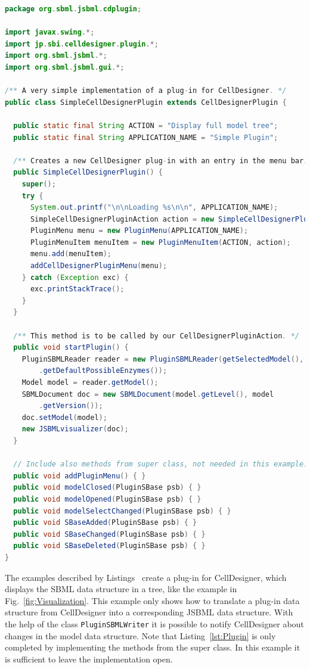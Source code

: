 \documentclass[
  BCOR12mm,
  letterpaper,
  11pt,
  headsepline,
  pointlessnumbers,
  tablecaptionabove,
  onelinecaption,
  headinclude,
  appendixprefix,
  idxtotoc,
  bibtotoc,
  twoside,
  titlepage
]{scrartcl}
\begin{document}
\begin{lstlisting}[language=Java,float,caption={A simple example for a
CellDesigner plug-in using JSBML as a communication layer},label=lst:Plugin]
package org.sbml.jsbml.cdplugin;

import javax.swing.*;
import jp.sbi.celldesigner.plugin.*;
import org.sbml.jsbml.*;
import org.sbml.jsbml.gui.*;

/** A very simple implementation of a plug-in for CellDesigner. */
public class SimpleCellDesignerPlugin extends CellDesignerPlugin {

  public static final String ACTION = "Display full model tree";
  public static final String APPLICATION_NAME = "Simple Plugin";

  /** Creates a new CellDesigner plug-in with an entry in the menu bar. */
  public SimpleCellDesignerPlugin() {
    super();
    try {
      System.out.printf("\n\nLoading %s\n\n", APPLICATION_NAME);
      SimpleCellDesignerPluginAction action = new SimpleCellDesignerPluginAction(this);
      PluginMenu menu = new PluginMenu(APPLICATION_NAME);
      PluginMenuItem menuItem = new PluginMenuItem(ACTION, action);
      menu.add(menuItem);
      addCellDesignerPluginMenu(menu);
    } catch (Exception exc) {
      exc.printStackTrace();
    }
  }

  /** This method is to be called by our CellDesignerPluginAction. */
  public void startPlugin() {
    PluginSBMLReader reader = new PluginSBMLReader(getSelectedModel(), SBO
        .getDefaultPossibleEnzymes());
    Model model = reader.getModel();
    SBMLDocument doc = new SBMLDocument(model.getLevel(), model
        .getVersion());
    doc.setModel(model);
    new JSBMLvisualizer(doc);
  }

  // Include also methods from super class, not needed in this example.
  public void addPluginMenu() { }
  public void modelClosed(PluginSBase psb) { }
  public void modelOpened(PluginSBase psb) { }
  public void modelSelectChanged(PluginSBase psb) { }
  public void SBaseAdded(PluginSBase psb) { }
  public void SBaseChanged(PluginSBase psb) { }
  public void SBaseDeleted(PluginSBase psb) { }
}
\end{lstlisting}
The examples described by Listings~
create a plug-in for CellDesigner, which displays the SBML data structure
in a tree, like the example in Fig.~\vref{fig:Visualization}. This example only
shows how to translate a plug-in data structure
from CellDesigner into a corresponding JSBML data structure. With the help of
the class \texttt{PluginSBMLWriter} it is possible to notify CellDesigner about
changes in the model data structure. Note that Listing~\vref{lst:Plugin} is only
completed by implementing the methods from the super class. In this example it
is sufficient to leave the implementation open.

\clearpage



\printindex
\end{document}
